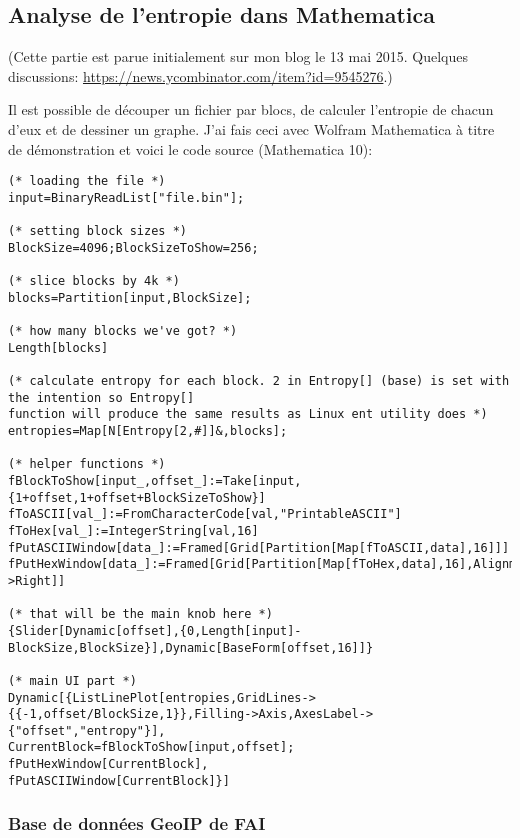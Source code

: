 \subsection{Analyse de l'entropie dans Mathematica}
\newcommand{\EntropyGfxScale}{0.8\textwidth}

(Cette partie est parue initialement sur mon blog le 13 mai 2015.
Quelques discussions: \url{https://news.ycombinator.com/item?id=9545276}.)

Il est possible de découper un fichier par blocs, de calculer l'entropie de chacun
d'eux et de dessiner un graphe.
J'ai fais ceci avec Wolfram Mathematica à titre de démonstration et voici le code
source (Mathematica 10):

\begin{lstlisting}[style=custommath]
(* loading the file *)
input=BinaryReadList["file.bin"];

(* setting block sizes *)
BlockSize=4096;BlockSizeToShow=256;

(* slice blocks by 4k *)
blocks=Partition[input,BlockSize];

(* how many blocks we've got? *)
Length[blocks]

(* calculate entropy for each block. 2 in Entropy[] (base) is set with the intention so Entropy[] 
function will produce the same results as Linux ent utility does *)
entropies=Map[N[Entropy[2,#]]&,blocks];

(* helper functions *)
fBlockToShow[input_,offset_]:=Take[input,{1+offset,1+offset+BlockSizeToShow}]
fToASCII[val_]:=FromCharacterCode[val,"PrintableASCII"]
fToHex[val_]:=IntegerString[val,16]
fPutASCIIWindow[data_]:=Framed[Grid[Partition[Map[fToASCII,data],16]]]
fPutHexWindow[data_]:=Framed[Grid[Partition[Map[fToHex,data],16],Alignment->Right]]

(* that will be the main knob here *)
{Slider[Dynamic[offset],{0,Length[input]-BlockSize,BlockSize}],Dynamic[BaseForm[offset,16]]}

(* main UI part *)
Dynamic[{ListLinePlot[entropies,GridLines->{{-1,offset/BlockSize,1}},Filling->Axis,AxesLabel->{"offset","entropy"}],
CurrentBlock=fBlockToShow[input,offset];
fPutHexWindow[CurrentBlock],
fPutASCIIWindow[CurrentBlock]}]
\end{lstlisting}

\subsubsection{Base de données GeoIP de FAI}

